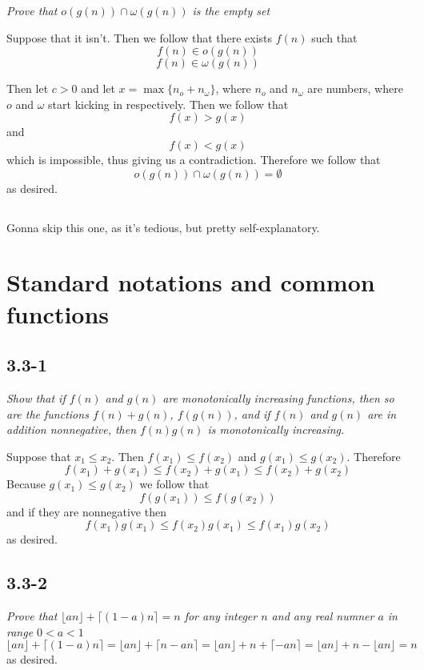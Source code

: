 \documentclass[11pt,oneside,titlepage]{book}
\begin{document}
\textit{Prove that $o(g(n)) \cap \omega(g(n))$ is the empty set}

Suppose that it isn't. Then we follow that there exists $f(n)$ such that
$$f(n) \in o(g(n))$$
$$f(n) \in \omega(g(n))$$

Then let $c > 0$ and let $x = \max\{n_o + n_\omega\}$, where $n_o$ and $n_\omega$ are numbers,
where $o$ and $\omega$ start kicking in respectively. Then we follow that
$$f(x) > g(x)$$
and
$$f(x) < g(x)$$
which is impossible, thus giving us a contradiction. Therefore we follow that
$$o(g(n)) \cap \omega(g(n)) = \emptyset$$
as desired.

\subsection{}

Gonna skip this one, as it's tedious, but pretty self-explanatory.


\section{Standard notations and common functions}

\subsection*{3.3-1}

\textit{Show that if $f(n)$ and $g(n)$ are monotonically increasing functions, then so are
  the functions $f(n) + g(n)$, $f(g(n))$, and if $f(n)$ and $g(n)$ are in addition nonnegative,
  then $f(n) g(n)$ is monotonically increasing.
}

Suppose that $x_1 \leq x_2$. Then $f(x_1) \leq f(x_2)$ and $g(x_1) \leq g(x_2)$. Therefore
$$f(x_1) + g(x_1) \leq f(x_2) + g(x_1) \leq f(x_2) + g(x_2)$$
Because $g(x_1) \leq g(x_2)$ we follow that
$$f(g(x_1)) \leq f(g(x_2))$$
and if they are nonnegative then
$$f(x_1) g(x_1) \leq f(x_2) g(x_1) \leq f(x_1) g(x_2)$$
as desired.

\subsection*{3.3-2}
\textit{Prove that $\lfloor an \rfloor + \lceil (1 - a)n \rceil = n$ for any integer $n$ and
  any real numner $a$ in range $0 < a < 1$}
$$\lfloor an \rfloor + \lceil (1 - a)n \rceil =
\lfloor an \rfloor + \lceil n - an \rceil =
\lfloor an \rfloor + n +  \lceil -   an \rceil =
\lfloor an \rfloor + n -  \lfloor an \rfloor = n 
$$
as desired.
\end{document}
